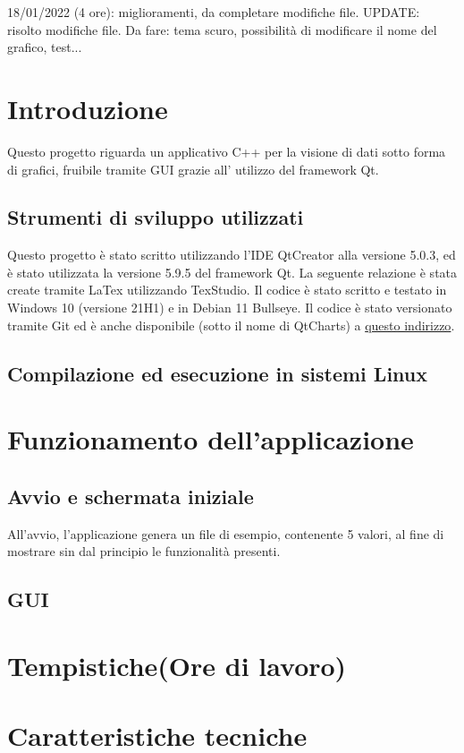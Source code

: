 \documentclass[10pt]{article}
\begin{document}
    18/01/2022 (4 ore): miglioramenti, da completare modifiche file. UPDATE: risolto modifiche file. Da fare: tema scuro, possibilità di modificare il nome del grafico, test...
    
    \newpage
    \tableofcontents
    \newpage
    \section{Introduzione}
     Questo progetto riguarda un applicativo C++ per la visione di dati sotto forma di grafici, fruibile tramite GUI grazie all' utilizzo del framework Qt.
    \subsection{Strumenti di sviluppo utilizzati}
    Questo progetto è stato scritto utilizzando l'IDE QtCreator alla versione 5.0.3, ed è stato utilizzata la versione 5.9.5 del framework Qt. 
    La seguente relazione è stata create tramite LaTex utilizzando TexStudio.
    Il codice è stato scritto e testato in Windows 10 (versione 21H1) e in Debian 11 Bullseye.
    Il codice è stato versionato tramite Git ed è anche disponibile (sotto il nome di QtCharts) a \href{https://github.com/nicolabaesso/qtCharts}{questo indirizzo}.
    \subsection{Compilazione ed esecuzione in sistemi Linux}
    \section{Funzionamento dell'applicazione}
    \subsection{Avvio e schermata iniziale}
    All'avvio, l'applicazione genera un file di esempio, contenente 5 valori, al fine di mostrare sin dal principio le funzionalità presenti.
    \subsection{GUI}
    \section{Tempistiche(Ore di lavoro)}
    \section{Caratteristiche tecniche}
\end{document}
